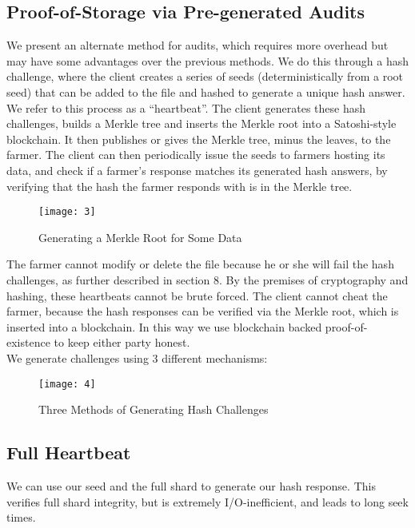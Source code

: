 \documentclass[a4paper,10pt]{article}
\begin{document}
\subsection{Proof-of-Storage via Pre-generated Audits}
We present an alternate method for audits, which requires more overhead but may have some advantages over the previous methods. We do this through a hash challenge, where the client creates a series of seeds (deterministically from a root seed) that can be added to the file and hashed to generate a unique hash answer. We refer to this process as a “heartbeat”. The client generates these hash challenges, builds a Merkle tree \cite{2} and inserts the Merkle root into a Satoshi-style blockchain. It then publishes or gives the Merkle tree, minus the leaves, to the farmer. The client can then periodically issue the seeds to farmers hosting its data, and check if a farmer’s response matches its generated hash answers, by verifying that the hash the farmer responds with is in the Merkle tree. \\

\begin{figure}[hbt]
\centering
\texttt{[image: 3]}
\caption{Generating a Merkle Root for Some Data}
\end{figure}

The farmer cannot modify or delete the file because he or she will fail the hash challenges, as further described in section 8. By the premises of cryptography and hashing, these heartbeats cannot be brute forced. The client cannot cheat the farmer, because the hash responses can be verified via the Merkle root, which is inserted into a blockchain. In this way we use blockchain backed proof-of-existence \cite{4} \cite{5} to keep either party honest.\\

We generate challenges using 3 different mechanisms: \\

\begin{figure}[hbt]
\centering
\texttt{[image: 4]}
\caption{Three Methods of Generating Hash Challenges}
\end{figure}

\subsection{Full Heartbeat}
We can use our seed and the full shard to generate our hash response. This verifies full shard integrity, but is extremely I/O-inefficient, and leads to long seek times.
\end{document}
